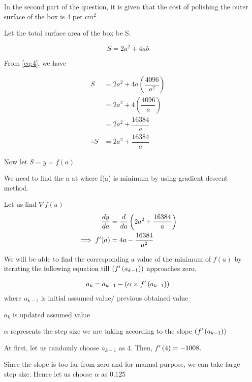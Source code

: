 \documentclass[journal,12pt,twocolumn]{IEEEtran}
\begin{document}
	 In the second part of the question, it is given that the cost of polishing the outer surface of the box is {\rupee}4 per cm$^2$
	 
	 Let the total surface area of the box be S.
	 
	 \begin{equation}
	    S = 2a^2 + 4ab
	 \end{equation}
	 
	 From \eqref{eq:4}, we have
	 
	 \begin{align}
	  S &= 2a^2 + 4a(\dfrac{4096}{a^2})\\
	    &= 2a^2 + 4(\dfrac{4096}{a})\\
	    &= 2a^2 + \dfrac{16384}{a}\\
	   \label{eq:9} \therefore S &= 2a^2 + \dfrac{16384}{a}
	    \end{align}
	    
	    Now let $S = y = f(a)$
	    
	    We need to find the a at where f(a) is minimum by using gradient descent method.
	    
Let us find $\nabla f(a)$
\begin{align}
    \frac{dy}{da} &= \frac{d}{da}\left(2a^2 + \dfrac{16384}{a}\right) \\
   \implies f^{\prime}(a) &= 4a-\dfrac{16384}{a^2}
\end{align}

We will be able to find the corresponding a value of the minimum of $f(a)$ by iterating the following equation till $\left(f^{\prime}\left(a_{k-1}\right)\right)$ approaches zero.

\begin{align}
a_{k} = a_{k-1} - \left(\alpha\times f^{\prime}\left(a_{k-1}\right)\right) 
\end{align}
where $a_{k-1}$ is initial assumed value/ previous obtained value

$a_k$ is updated assumed value

$\alpha$ represents the step size we are taking according to the slope $\left(f^{\prime}\left(a_{k-1}\right)\right)$

At first, let us randomly choose $a_{k-1}$ as $4$. Then, $f^{\prime}\left(4\right) = -1008 $.

Since the slope is too far from zero and for manual purpose, we can take large step size. Hence let us choose $\alpha$ as $0.125$ 
\end{document}
